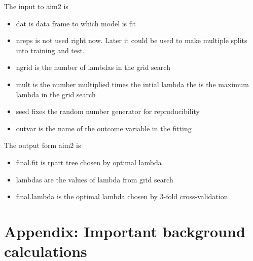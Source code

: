 \documentclass[12pt]{article}
\begin{document}
The input to aim2 is
\begin{itemize}
\item dat is data frame to which model is fit
\item nreps is not used right now.  Later it could be used to make
  multiple splits into training and test.
\item ngrid is the number of lambdas in the grid search
\item mult is the number multiplied times the intial lambda the is the
  maximum lambda in the grid search
\item seed fixes the random number generator for reproducibility
\item outvar is the name of the outcome variable in the fitting
\end{itemize}  

The output form aim2 is
\begin{itemize}
\item final.fit is rpart tree chosen by optimal lambda
\item lambdas are the values of lambda from grid search
\item final.lambda is the optimal lambda chosen by 3-fold cross-validation
\end{itemize}



\section{Appendix: Important background calculations}
\label{bkgrnd}
\end{document}
